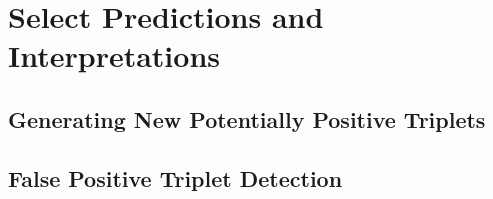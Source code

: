 \chapter{Select Predictions and Interpretations}\label{ch:select-predictions-and-interpretations}


\section{Generating New Potentially Positive Triplets}


\section{False Positive Triplet Detection}



